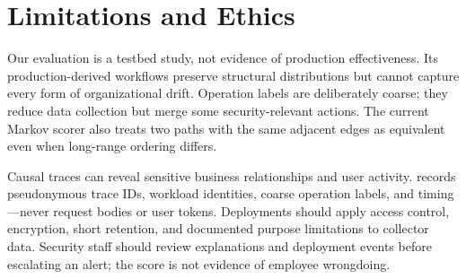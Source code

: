 \section{Limitations and Ethics}
\label{sec:limitations}

Our evaluation is a testbed study, not evidence of production effectiveness.
Its production-derived workflows preserve structural distributions but cannot
capture every form of organizational drift. Operation labels are deliberately
coarse; they reduce data collection but merge some security-relevant actions.
The current Markov scorer also treats two paths with the same adjacent edges as
equivalent even when long-range ordering differs.

Causal traces can reveal sensitive business relationships and user activity.
\system{} records pseudonymous trace IDs, workload identities, coarse operation
labels, and timing---never request bodies or user tokens. Deployments should
apply access control, encryption, short retention, and documented purpose
limitations to collector data. Security staff should review explanations and
deployment events before escalating an alert; the score is not evidence of
employee wrongdoing.

